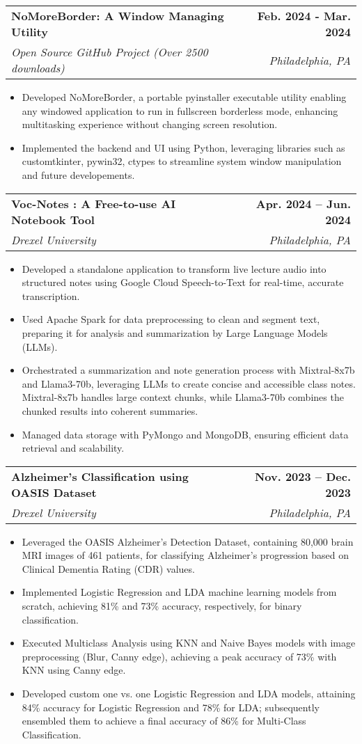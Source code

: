 \documentclass[letterpaper,10pt]{article}
\makeatletter
\newcommand{\resumeItem}[1]{
  \item\small{
    {#1 \vspace{-4pt}}
  }
}
\newcommand{\resumeSubheading}[4]{
  \vspace{0pt}\item
    \begin{tabular*}{0.97\textwidth}[t]{l@{\extracolsep{\fill}}r}
      \textbf{#1} & \textbf{#2} \\
      \textit{\small#3} & \textit{\small #4} \\
    \end{tabular*}\vspace{-7pt}
}
\newcommand{\resumeItemListStart}{\begin{itemize}}
\newcommand{\resumeItemListEnd}{\end{itemize}\vspace{-5pt}}
\makeatother
\begin{document}
\resumeSubheading
    {NoMoreBorder: A Window Managing Utility}{Feb. 2024 - Mar. 2024}
    {Open Source GitHub Project (Over 2500 downloads)}{Philadelphia, PA}
    \resumeItemListStart
      \resumeItem{Developed NoMoreBorder, a portable pyinstaller executable utility enabling any windowed application to run in fullscreen borderless mode, enhancing multitasking experience without changing screen resolution.}
      \resumeItem{Implemented the backend and UI using Python, leveraging libraries such as customtkinter, pywin32, ctypes to streamline system window manipulation and future developements.}
    \resumeItemListEnd

    \resumeSubheading
    {Voc-Notes  : A Free-to-use AI Notebook Tool}{Apr. 2024 -- Jun. 2024}
    {Drexel University}{Philadelphia, PA}
    \resumeItemListStart
      \resumeItem{Developed a standalone application to transform live lecture audio into structured notes using Google Cloud Speech-to-Text for real-time, accurate transcription.}
      \resumeItem{Used Apache Spark for data preprocessing to clean and segment text, preparing it for analysis and summarization by Large Language Models (LLMs).}
      \resumeItem{Orchestrated a summarization and note generation process with Mixtral-8x7b and Llama3-70b, leveraging LLMs to create concise and accessible class notes. Mixtral-8x7b handles large context chunks, while Llama3-70b combines the chunked results into coherent summaries.}
      \resumeItem{Managed data storage with PyMongo and MongoDB, ensuring efficient data retrieval and scalability.}
    \resumeItemListEnd

    \resumeSubheading
    {Alzheimer's Classification using OASIS Dataset}{Nov. 2023 -- Dec. 2023}
    {Drexel University}{Philadelphia, PA}
    \resumeItemListStart
      \resumeItem{Leveraged the OASIS Alzheimer's Detection Dataset, containing 80,000 brain MRI images of 461 patients, for classifying Alzheimer's progression based on Clinical Dementia Rating (CDR) values.}
      \resumeItem{Implemented Logistic Regression and LDA machine learning models from scratch, achieving 81\% and 73\% accuracy, respectively, for binary classification.}
      \resumeItem{Executed Multiclass Analysis using KNN and Naive Bayes models with image preprocessing (Blur, Canny edge), achieving a peak accuracy of 73\% with KNN using Canny edge.}
      \resumeItem{Developed custom one vs. one Logistic Regression and LDA models, attaining 84\% accuracy for Logistic Regression and 78\% for LDA; subsequently ensembled them to achieve a final accuracy of 86\% for Multi-Class Classification.}
    \resumeItemListEnd
      
\end{document}
